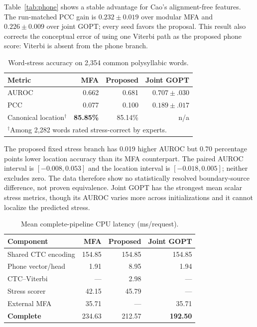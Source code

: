 \documentclass[10pt,conference]{IEEEtran}
\begin{document}
Table~\ref{tab:phone} shows a stable advantage for Cao's alignment-free
features. The run-matched PCC gain is $0.232\pm0.019$ over modular MFA and
$0.226\pm0.009$ over joint GOPT; every seed favors the proposal. This result
also corrects the conceptual error of using one Viterbi path as the proposed
phone score: Viterbi is absent from the phone branch.

\begin{table}[t]
\centering
\caption{Word-stress accuracy on 2,354 common polysyllabic words.}
\label{tab:stress}
\footnotesize
\setlength{\tabcolsep}{3pt}
\begin{tabular}{@{}lrrr@{}}
\toprule
Metric & MFA & Proposed & Joint GOPT \\
\midrule
AUROC & 0.662 & 0.681 & $\mathbf{0.707\pm.030}$ \\
PCC & 0.077 & 0.100 & $\mathbf{0.189\pm.017}$ \\
Canonical location$^\dagger$ & \textbf{85.85\%} & 85.14\% & n/a \\
\bottomrule
\multicolumn{4}{l}{\footnotesize $^\dagger$Among 2,282 words rated stress-correct by experts.}
\end{tabular}
\end{table}

The proposed fixed stress branch has 0.019 higher AUROC but 0.70 percentage
points lower location accuracy than its MFA counterpart. The paired AUROC
interval is $[-0.008,0.053]$ and the location interval is
$[-0.018,0.005]$; neither excludes zero. The data therefore show no
statistically resolved boundary-source difference, not proven equivalence.
Joint GOPT has the strongest mean scalar stress metrics, though its AUROC varies
more across initializations and it cannot localize the predicted stress.

\begin{table}[t]
\centering
\caption{Mean complete-pipeline CPU latency (ms/request).}
\label{tab:latency}
\footnotesize
\setlength{\tabcolsep}{2.5pt}
\begin{tabular}{@{}lrrr@{}}
\toprule
Component & MFA & Proposed & Joint GOPT \\
\midrule
Shared CTC encoding & 154.85 & 154.85 & 154.85 \\
Phone vector/head & 1.91 & 8.95 & 1.94 \\
CTC--Viterbi & --- & 2.98 & --- \\
Stress scorer & 42.15 & 45.79 & --- \\
External MFA & 35.71 & --- & 35.71 \\
\midrule
\textbf{Complete} & 234.63 & 212.57 & \textbf{192.50} \\
\bottomrule
\end{tabular}
\end{table}
\end{document}
